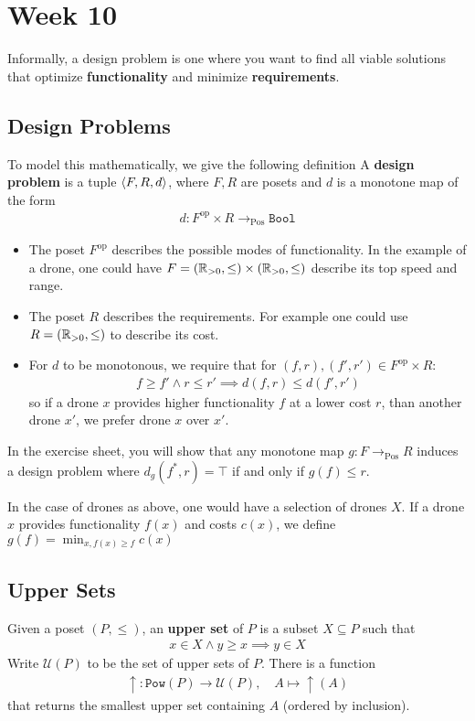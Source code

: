 \section{Week 10}
Informally, a design problem is one where you want to find all viable solutions that optimize \textbf{functionality} and minimize \textbf{requirements}.

\subsection{Design Problems}


To model this mathematically, we give the following definition
A \textbf{design problem} is a tuple $\langle F,R,d\rangle$, where $F,R$ are posets and $d$ is a monotone map of the form
\begin{align*}
  d: F^{\text{op}} \times R \to_{\text{Pos}} \texttt{Bool}
\end{align*}
\begin{itemize}
  \item The poset $F^{\text{op}}$ describes the possible modes of functionality. In the example of a drone, one could have $F = (\mathbb{R}_{>0},\leq) \times (\mathbb{R}_{>0},\leq)$ describe its top speed and range.
  \item The poset $R$ describes the requirements. For example one could use $R = (\mathbb{R}_{> 0},\leq)$ to describe its cost.
  \item For $d$ to be monotonous, we require that for $(f,r),(f',r') \in F^{\text{op}} \times R$:
    \begin{align*}
      f \geq f' \land r \leq r' \implies d(f,r) \leq d(f',r')
    \end{align*}
    so if a drone $x$ provides higher functionality $f$ at a lower cost $r$, than another drone $x'$, we prefer drone $x$ over $x'$.
\end{itemize}

In the exercise sheet, you will show that any monotone map $g: F \to_{\text{Pos}} R$ induces a design problem where $d_g(f^{\ast},r) = \top$ if and only if $g(f) \leq r$.

In the case of drones as above, one would have a selection of drones $X$. If a drone $x$ provides functionality $f(x)$ and costs $c(x)$, we define $g(f) = \min_{x, f(x) \geq f} c(x)$


\subsection{Upper Sets}
Given a poset $(P,\leq)$, an \textbf{upper set} of $P$ is a subset $X \subseteq P$ such that
\begin{align*}
  x \in X \land y \geq x \implies y \in X
\end{align*}
Write $\mathcal{U}(P)$ to be the set of upper sets of $P$.
There is a function
\begin{align*}
  \uparrow: \texttt{Pow}(P) \to \mathcal{U}(P),
  \quad
  A \mapsto \uparrow(A)
\end{align*}
that returns the smallest upper set containing $A$ (ordered by inclusion).

